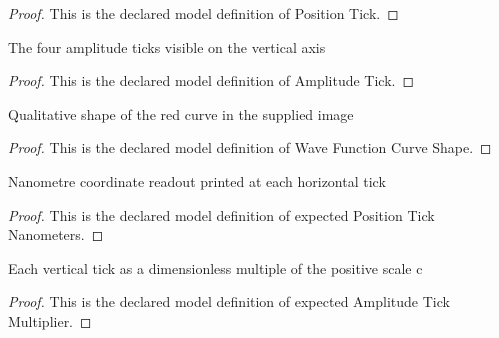 \begin{proof}
  This is the declared model definition of Position Tick.
\end{proof}
\begin{definition}
  \label{def:physics:phyx-mini-0647:phyxminiproblems-problemphyxmini0647-amplitudetick}
  The four amplitude ticks visible on the vertical axis
\end{definition}
\begin{proof}
  This is the declared model definition of Amplitude Tick.
\end{proof}
\begin{definition}
  \label{def:physics:phyx-mini-0647:phyxminiproblems-problemphyxmini0647-wavefunctioncurveshape}
  Qualitative shape of the red curve in the supplied image
\end{definition}
\begin{proof}
  This is the declared model definition of Wave Function Curve Shape.
\end{proof}
\begin{definition}
  \label{def:physics:phyx-mini-0647:phyxminiproblems-problemphyxmini0647-expectedpositionticknanometers}
  Nanometre coordinate readout printed at each horizontal tick
\end{definition}
\begin{proof}
  This is the declared model definition of expected Position Tick Nanometers.
\end{proof}
\begin{definition}
  \label{def:physics:phyx-mini-0647:phyxminiproblems-problemphyxmini0647-expectedamplitudetickmultiplier}
  Each vertical tick as a dimensionless multiple of the positive scale c
\end{definition}
\begin{proof}
  This is the declared model definition of expected Amplitude Tick Multiplier.
\end{proof}
